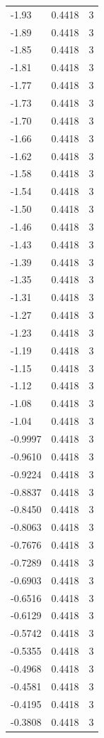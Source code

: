 \begin{longtable}{lrr}
  -1.93 & 0.4418 & 3 \\
  -1.89 & 0.4418 & 3 \\
  -1.85 & 0.4418 & 3 \\
  -1.81 & 0.4418 & 3 \\
  -1.77 & 0.4418 & 3 \\
  -1.73 & 0.4418 & 3 \\
  -1.70 & 0.4418 & 3 \\
  -1.66 & 0.4418 & 3 \\
  -1.62 & 0.4418 & 3 \\
  -1.58 & 0.4418 & 3 \\
  -1.54 & 0.4418 & 3 \\
  -1.50 & 0.4418 & 3 \\
  -1.46 & 0.4418 & 3 \\
  -1.43 & 0.4418 & 3 \\
  -1.39 & 0.4418 & 3 \\
  -1.35 & 0.4418 & 3 \\
  -1.31 & 0.4418 & 3 \\
  -1.27 & 0.4418 & 3 \\
  -1.23 & 0.4418 & 3 \\
  -1.19 & 0.4418 & 3 \\
  -1.15 & 0.4418 & 3 \\
  -1.12 & 0.4418 & 3 \\
  -1.08 & 0.4418 & 3 \\
  -1.04 & 0.4418 & 3 \\
  -0.9997 & 0.4418 & 3 \\
  -0.9610 & 0.4418 & 3 \\
  -0.9224 & 0.4418 & 3 \\
  -0.8837 & 0.4418 & 3 \\
  -0.8450 & 0.4418 & 3 \\
  -0.8063 & 0.4418 & 3 \\
  -0.7676 & 0.4418 & 3 \\
  -0.7289 & 0.4418 & 3 \\
  -0.6903 & 0.4418 & 3 \\
  -0.6516 & 0.4418 & 3 \\
  -0.6129 & 0.4418 & 3 \\
  -0.5742 & 0.4418 & 3 \\
  -0.5355 & 0.4418 & 3 \\
  -0.4968 & 0.4418 & 3 \\
  -0.4581 & 0.4418 & 3 \\
  -0.4195 & 0.4418 & 3 \\
  -0.3808 & 0.4418 & 3 \\

\end{longtable}
